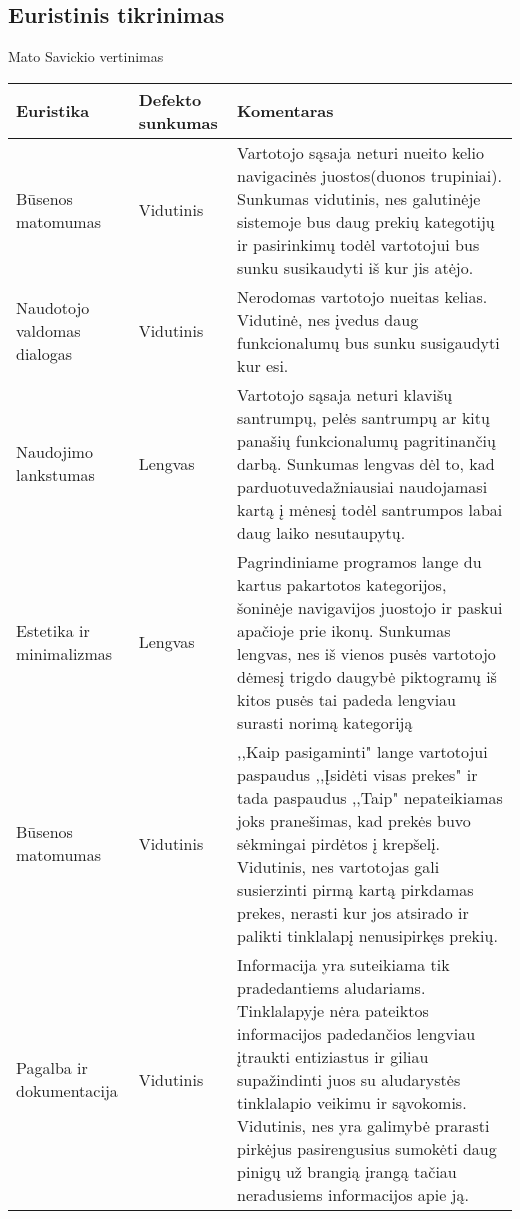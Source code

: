 \documentclass[oneside]{VUMIFPSkursinis}
\begin{document}
	\subsection{Euristinis tikrinimas}
Mato Savickio vertinimas
\begin{center}
    \begin{tabular}{ |p{3cm}| p{3cm} | p{11cm} | }
    \hline
   	 Euristika &Defekto sunkumas &Komentaras \\ \hline 
	Būsenos matomumas & Vidutinis & Vartotojo sąsaja neturi nueito kelio navigacinės juostos(duonos trupiniai). Sunkumas vidutinis, nes galutinėje sistemoje bus daug prekių kategotijų ir pasirinkimų todėl vartotojui bus sunku susikaudyti iš kur jis atėjo. \\ \hline
	Naudotojo valdomas dialogas & Vidutinis & Nerodomas vartotojo nueitas kelias. Vidutinė, nes įvedus daug funkcionalumų bus sunku susigaudyti kur esi. \\ \hline
	Naudojimo lankstumas & Lengvas & Vartotojo sąsaja neturi klavišų santrumpų, pelės santrumpų ar kitų panašių funkcionalumų pagritinančių darbą.
							Sunkumas lengvas dėl to, kad parduotuvedažniausiai naudojamasi kartą į mėnesį todėl santrumpos labai daug laiko nesutaupytų. \\ \hline
	Estetika ir minimalizmas & Lengvas & Pagrindiniame programos lange du kartus pakartotos kategorijos, šoninėje navigavijos juostojo ir paskui apačioje prie ikonų. Sunkumas lengvas, nes iš vienos pusės vartotojo dėmesį trigdo daugybė piktogramų iš kitos pusės tai padeda lengviau surasti norimą kategoriją \\ \hline
	Būsenos matomumas & Vidutinis & ,,Kaip pasigaminti" lange vartotojui paspaudus ,,Įsidėti visas prekes" ir tada paspaudus ,,Taip" nepateikiamas joks pranešimas, kad prekės buvo sėkmingai  pirdėtos į krepšelį. Vidutinis, nes vartotojas gali susierzinti pirmą kartą pirkdamas prekes, nerasti kur jos atsirado ir palikti tinklalapį nenusipirkęs prekių. \\ \hline
	Pagalba ir dokumentacija & Vidutinis & Informacija yra suteikiama tik pradedantiems aludariams.
							Tinklalapyje nėra pateiktos informacijos padedančios lengviau įtraukti entiziastus ir giliau supažindinti juos su aludarystės tinklalapio veikimu ir sąvokomis. Vidutinis, nes yra galimybė prarasti pirkėjus pasirengusius sumokėti daug pinigų už brangią įrangą tačiau neradusiems informacijos apie ją. \\ \hline

	
	
   \hline
    \end{tabular}
\end{center}
\pagebreak
\end{document}
